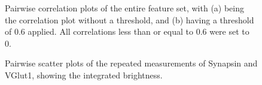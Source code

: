 \documentclass{article}
\begin{document}
\begin{figure}
\centering 
{}
\caption{Pairwise correlation plots of the entire feature set, with (a) being the correlation plot without a threshold, and (b) having a threshold of 0.6 applied. All correlations less than or equal to 0.6 were set to 0.}
\label{fig:figure1}
\end{figure}

\begin{figure}
\centering 
{}
\caption{Pairwise scatter plots of the repeated measurements of Synapsin and VGlut1, showing the integrated brightness.}
\label{fig:figure2}
\end{figure}
\end{document}
